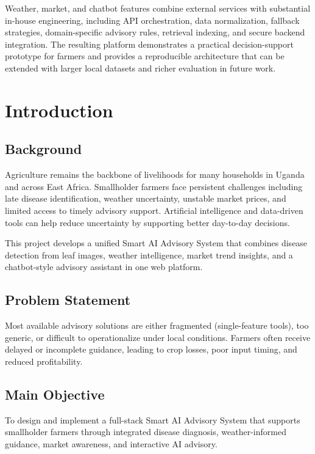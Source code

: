 \documentclass[12pt,a4paper]{report}
\begin{document}
Weather, market, and chatbot features combine external services with substantial in-house engineering, including API orchestration, data normalization, fallback strategies, domain-specific advisory rules, retrieval indexing, and secure backend integration. The resulting platform demonstrates a practical decision-support prototype for farmers and provides a reproducible architecture that can be extended with larger local datasets and richer evaluation in future work.

\tableofcontents
\listoftables
\listoffigures

\clearpage
{}

\chapter{Introduction}

\section{Background}
Agriculture remains the backbone of livelihoods for many households in Uganda and across East Africa. Smallholder farmers face persistent challenges including late disease identification, weather uncertainty, unstable market prices, and limited access to timely advisory support. Artificial intelligence and data-driven tools can help reduce uncertainty by supporting better day-to-day decisions.

This project develops a unified Smart AI Advisory System that combines disease detection from leaf images, weather intelligence, market trend insights, and a chatbot-style advisory assistant in one web platform.

\section{Problem Statement}
Most available advisory solutions are either fragmented (single-feature tools), too generic, or difficult to operationalize under local conditions. Farmers often receive delayed or incomplete guidance, leading to crop losses, poor input timing, and reduced profitability.

\section{Main Objective}
To design and implement a full-stack Smart AI Advisory System that supports smallholder farmers through integrated disease diagnosis, weather-informed guidance, market awareness, and interactive AI advisory.
\end{document}
